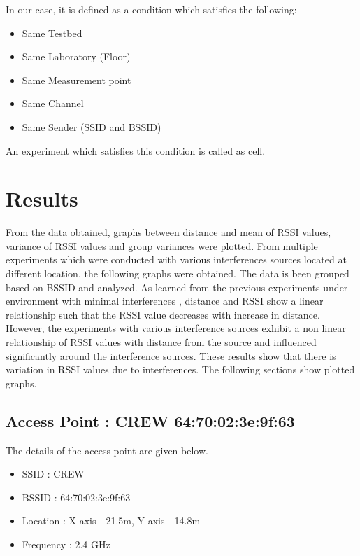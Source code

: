 \documentclass[11pt,a4paper,headinclude,footinclude,chapterprefix=on]{scrreprt}
\begin{document}
In our case, it is defined as a condition which satisfies the following: 
\begin{itemize}
	\item Same Testbed 
	\item Same Laboratory (Floor) 
	\item Same Measurement point 
	\item Same Channel 
	\item Same Sender (SSID and BSSID) 
\end{itemize}

An experiment which satisfies this condition is called as cell. 

\chapter{Results} From the data obtained, graphs between distance and mean of RSSI values, variance of RSSI values and group variances were plotted. From multiple experiments which were conducted with various interferences sources located at different location, the following graphs were obtained. The data is been grouped based on BSSID and analyzed. As learned from the previous experiments under environment with minimal interferences \cite{ref:rssi}, distance and RSSI show a linear relationship such that the RSSI value decreases with increase in distance. However, the experiments with various interference sources exhibit a non linear relationship of RSSI values with distance from the source and influenced significantly around the interference sources. These results show that there is variation in RSSI values due to interferences. The following sections show plotted graphs.

\pagebreak 
\section{Access Point : CREW 64:70:02:3e:9f:63} 
The details of the access point are given below.
\begin{itemize}
	\item SSID : CREW 
	\item BSSID : 64:70:02:3e:9f:63 
	\item Location : X-axis - 21.5m, Y-axis - 14.8m 
	\item Frequency : 2.4 GHz 
\end{itemize}
\end{document}
